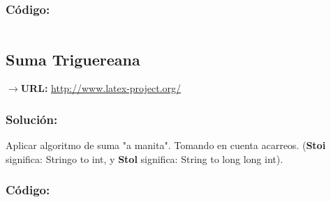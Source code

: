\documentclass[12pt]{article}
\begin{document}
            \subsubsection{Código:}
                \inputminted{cpp}{Code/MMM.cpp}
                
          \subsection{Suma Triguereana}
            $\rightarrow$\textbf{URL: }\url{http://www.latex-project.org/}
            
            \subsubsection{Solución:}
                Aplicar algoritmo de suma "a manita". Tomando en cuenta acarreos. (\textbf{Stoi} significa: Stringo to int, y \textbf{Stol} significa: String to long long int).
            
            \subsubsection{Código:}
                \inputminted{cpp}{Code/suma.cpp}
                
                
        
        
        
        
    
    
\end{document}

